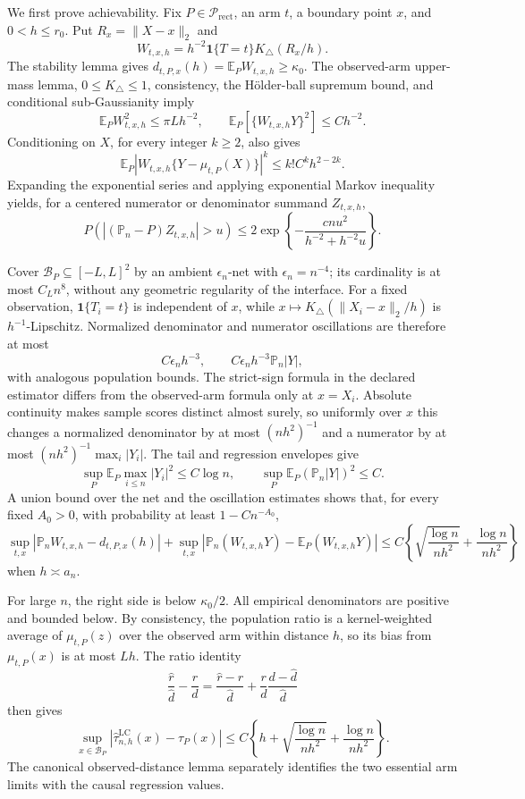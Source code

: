 We first prove achievability.  Fix \(P\in\mathcal P_{\mathrm{rect}}\), an arm \(t\), a boundary point \(x\), and \(0<h\leq r_0\).  Put \(R_x=\lVert X-x\rVert_2\) and
\[
 W_{t,x,h}=h^{-2}\mathbf1\{T=t\}K_\triangle(R_x/h).
\]
The stability lemma gives \(d_{t,P,x}(h)=\mathbb E_PW_{t,x,h}\geq\kappa_0\).  The observed-arm upper-mass lemma, \(0\leq K_\triangle\leq1\), consistency, the H\"older-ball supremum bound, and conditional sub-Gaussianity imply
\[
 \mathbb E_PW_{t,x,h}^2\leq\pi Lh^{-2},
 \qquad
 \mathbb E_P[\{W_{t,x,h}Y\}^2]\leq Ch^{-2}.
\]
Conditioning on \(X\), for every integer \(k\geq2\), also gives
\[
 \mathbb E_P|W_{t,x,h}\{Y-\mu_{t,P}(X)\}|^k
 \leq k!C^kh^{2-2k}.
\]
Expanding the exponential series and applying exponential Markov inequality yields, for a centered numerator or denominator summand \(Z_{t,x,h}\),
\[
 P\!\left(\left|(\mathbb P_n-P)Z_{t,x,h}\right|>u\right)
 \leq2\exp\!\left\{-\frac{cnu^2}{h^{-2}+h^{-2}u}\right\}.
\]

Cover \(\mathcal B_P\subseteq[-L,L]^2\) by an ambient \(\epsilon_n\)-net with \(\epsilon_n=n^{-4}\); its cardinality is at most \(C_Ln^8\), without any geometric regularity of the interface.  For a fixed observation, \(\mathbf1\{T_i=t\}\) is independent of \(x\), while \(x\mapsto K_\triangle(\lVert X_i-x\rVert_2/h)\) is \(h^{-1}\)-Lipschitz.  Normalized denominator and numerator oscillations are therefore at most
\[
 C\epsilon_nh^{-3},
 \qquad C\epsilon_nh^{-3}\mathbb P_n|Y|,
\]
with analogous population bounds.  The strict-sign formula in the declared estimator differs from the observed-arm formula only at \(x=X_i\).  Absolute continuity makes sample scores distinct almost surely, so uniformly over \(x\) this changes a normalized denominator by at most \((nh^2)^{-1}\) and a numerator by at most \((nh^2)^{-1}\max_i|Y_i|\).  The tail and regression envelopes give
\[
 \sup_P\mathbb E_P\max_{i\leq n}|Y_i|^2\leq C\log n,
 \qquad
 \sup_P\mathbb E_P(\mathbb P_n|Y|)^2\leq C.
\]
A union bound over the net and the oscillation estimates shows that, for every fixed \(A_0>0\), with probability at least \(1-Cn^{-A_0}\),
\[
 \sup_{t,x}|\mathbb P_nW_{t,x,h}-d_{t,P,x}(h)|
 +\sup_{t,x}|\mathbb P_n(W_{t,x,h}Y)-\mathbb E_P(W_{t,x,h}Y)|
 \leq C\left\{\sqrt{\frac{\log n}{nh^2}}+\frac{\log n}{nh^2}\right\}
\]
when \(h\asymp a_n\).

For large \(n\), the right side is below \(\kappa_0/2\).  All empirical denominators are positive and bounded below.  By consistency, the population ratio is a kernel-weighted average of \(\mu_{t,P}(z)\) over the observed arm within distance \(h\), so its bias from \(\mu_{t,P}(x)\) is at most \(Lh\).  The ratio identity
\[
 \frac{\widehat r}{\widehat d}-\frac rd
 =\frac{\widehat r-r}{\widehat d}
 +\frac rd\frac{d-\widehat d}{\widehat d}
\]
then gives
\[
 \sup_{x\in\mathcal B_P}
 |\widehat\tau^{\mathrm{LC}}_{n,h}(x)-\tau_P(x)|
 \leq C\left\{h+\sqrt{\frac{\log n}{nh^2}}+\frac{\log n}{nh^2}\right\}.
\]
The canonical observed-distance lemma separately identifies the two essential arm limits with the causal regression values.

